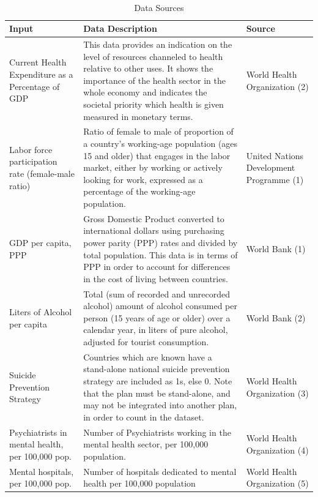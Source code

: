 \documentclass[]{article}
\begin{document}
\begin{table}[H]
\centering 
\caption{Data Sources}
\
\begin{tabular}{p{3cm}p{7cm}p{5cm}}  
\hline  
  Input & Data Description  & Source  \\   
\hline 
Current Health Expenditure as a Percentage of GDP & This data provides an indication on the level of resources channeled to health relative to other uses. It shows the importance of the health sector in the whole economy and indicates the societal priority which health is given measured in monetary terms. & World Health Organization (2)  \\   
 \hline 
Labor force participation rate (female-male ratio) & Ratio of female to male of proportion of a country’s working-age population (ages 15 and older) that engages in the labor market, either by working or actively looking for work, expressed as a percentage of the working-age population. & United Nations Development Programme (1) \\   
\hline 
GDP per capita, PPP & Gross Domestic Product converted to international dollars using purchasing power parity (PPP) rates and divided by total population. This data is in terms of PPP in order to account for differences in the cost of living between countries. & World Bank (1) \\
\hline 
Liters of Alcohol per capita &  Total (sum of recorded and unrecorded alcohol) amount of alcohol consumed per person (15 years of age or older) over a calendar year, in liters of pure alcohol, adjusted for tourist consumption. & World Bank (2) \\
\hline 
Suicide Prevention Strategy &  Countries which are known have a stand-alone national suicide prevention strategy are included as 1s, else 0. Note that the plan must be stand-alone, and may not be integrated into another plan, in order to count in the dataset. & World Health Organization (3) \\
\hline
Psychiatrists in mental health, per 100,000 pop. & Number of Psychiatrists working in the mental health sector, per 100,000 population.  & World Health Organization (4)  \\
\hline
Mental hospitals, per 100,000 pop. & Number of hospitals dedicated to mental health per 100,000 population & World Health Organization (5) \\
\hline
\end{tabular} 
\end{table}

\newpage
\end{document}
